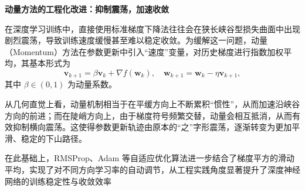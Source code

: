 
\textbf{动量方法的工程化改进：抑制震荡，加速收敛}

在深度学习训练中，直接使用标准梯度下降法往往会在狭长峡谷型损失曲面中出现剧烈震荡，导致训练速度缓慢甚至难以稳定收敛。为缓解这一问题，动量（Momentum）方法在参数更新中引入“速度”变量，对历史梯度进行指数加权平均，其基本形式为
\[
\mathbf{v}_{k+1} = \beta \mathbf{v}_k + \nabla f(\mathbf{w}_k), \quad
\mathbf{w}_{k+1} = \mathbf{w}_k - \eta \mathbf{v}_{k+1},
\]
其中 $\beta \in (0,1)$ 为动量系数。

从几何直觉上看，动量机制相当于在平缓方向上不断累积“惯性”，从而加速沿峡谷方向的前进；而在陡峭方向上，由于梯度符号频繁交替，动量会相互抵消，从而有效抑制横向震荡。这使得参数更新轨迹由原本的“之”字形震荡，逐渐转变为更加平滑、稳定的下山路径。

在此基础上，RMSProp、Adam 等自适应优化算法进一步结合了梯度平方的滑动平均，实现了对不同方向学习率的自动调节，从工程实践角度显著提升了深度神经网络的训练稳定性与收敛效率
